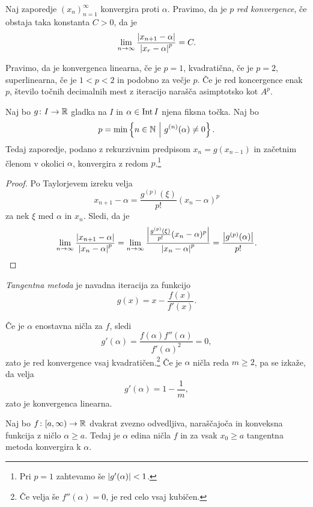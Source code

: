 \begin{definicija}
Naj zaporedje $(x_n)_{n=1}^\infty$ konvergira proti $\alpha$.
Pravimo, da je $p$ \emph{red konvergence},
če obstaja taka konstanta $C > 0$, da je
\[
\lim_{n \to \infty}
\frac{\left\lvert x_{n+1} - \alpha\right\rvert}{\left\lvert x_r - \alpha\right\rvert^p} = C.
\]
\end{definicija}

\begin{opomba}
Pravimo, da je konvergenca linearna, če je $p = 1$, kvadratična, če
je $p = 2$, superlinearna, če je $1 < p < 2$ in podobno za večje
$p$. Če je red koncergence enak $p$, število točnih decimalnih mest
z iteracijo narašča asimptotsko kot $A^p$.
\end{opomba}

\begin{izrek}
Naj bo $g \colon I \to \mathbb{R}$ gladka na $I$ in $\alpha \in \operatorname{Int} I$
njena fiksna točka. Naj bo
\[
p = \min \left\{n \in \mathbb{N}~\middle\vert~g^{(n)}(\alpha) \ne 0\right\}.
\]
Tedaj zaporedje, podano z rekurzivnim predpisom $x_n = g(x_{n-1})$
in začetnim členom v okolici $\alpha$, konvergira z redom
$p$.\footnote{Pri $p=1$ zahtevamo še $\left\lvert g'(\alpha)\right\rvert < 1$.}
\end{izrek}

\begin{proof}
Po Taylorjevem izreku velja
\[
x_{n+1} - \alpha = \frac{g^{(p)}(\xi)}{p!} (x_n - \alpha)^p
\]
za nek $\xi$ med $\alpha$ in $x_n$. Sledi, da je
\[
\lim_{n \to \infty}
\frac{\left\lvert x_{n+1} - \alpha\right\rvert}{\left\lvert x_n - \alpha\right\rvert^p} =
\lim_{n \to \infty}
\frac{\left\lvert \frac{g^{(p)}(\xi)}{p!} (x_n - \alpha)^p\right\rvert}{
\left\lvert x_n - \alpha\right\rvert^p} =
\frac{\left\lvert g^{(p)}(\alpha)\right\rvert}{p!}. \qedhere
\]
\end{proof}

\begin{definicija}
\emph{Tangentna metoda} je
navadna iteracija za funkcijo
\[
g(x) = x - \frac{f(x)}{f'(x)}.
\]
\end{definicija}

\begin{opomba}
Če je $\alpha$ enostavna ničla za $f$, sledi
\[
g'(\alpha) = \frac{f(\alpha) f''(\alpha)}{f'(\alpha)^2} = 0,
\]
zato je red konvergence vsaj kvadratičen.\footnote{Če velja še
$f''(\alpha) = 0$, je red celo vsaj kubičen.} Če je $\alpha$ ničla
reda $m \geq 2$, pa se izkaže, da velja
\[
g'(\alpha) = 1 - \frac{1}{m},
\]
zato je konvergenca linearna.
\end{opomba}

\begin{izrek}
Naj bo $f \colon [a, \infty) \to \mathbb{R}$ dvakrat zvezno odvedljiva,
naraščajoča in konveksna funkcija z ničlo $\alpha \geq a$. Tedaj
je $\alpha$ edina ničla $f$ in za vsak $x_0 \geq a$ tangentna
metoda konvergira k $\alpha$.
\end{izrek}

